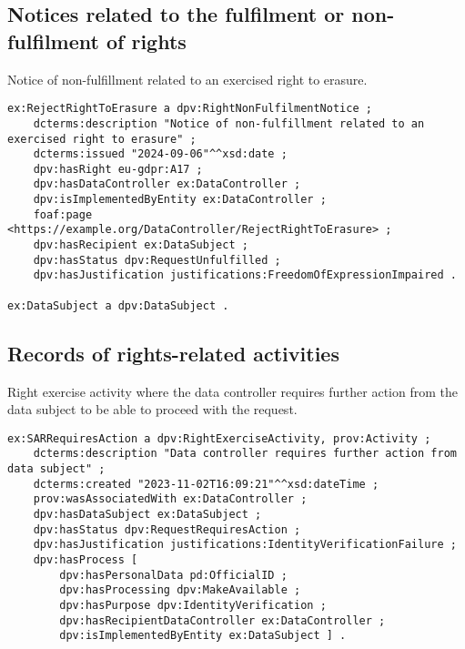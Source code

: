 \documentclass{IOS-Book-Article}     %
\begin{document}
\subsection{Notices related to the fulfilment or non-fulfilment of rights}
\label{sec:notices}

\begin{listing}
\caption{Notice of non-fulfillment related to an exercised right to erasure.}
\label{lst:notice}
\begin{verbatim}
ex:RejectRightToErasure a dpv:RightNonFulfilmentNotice ;
    dcterms:description "Notice of non-fulfillment related to an exercised right to erasure" ;
    dcterms:issued "2024-09-06"^^xsd:date ;
    dpv:hasRight eu-gdpr:A17 ;
    dpv:hasDataController ex:DataController ;
    dpv:isImplementedByEntity ex:DataController ;
    foaf:page <https://example.org/DataController/RejectRightToErasure> ;
    dpv:hasRecipient ex:DataSubject ;
    dpv:hasStatus dpv:RequestUnfulfilled ;
    dpv:hasJustification justifications:FreedomOfExpressionImpaired .

ex:DataSubject a dpv:DataSubject .
\end{verbatim}
\end{listing}

\subsection{Records of rights-related activities}
\label{sec:records}

\begin{listing}
\caption{Right exercise activity where the data controller requires further action from the data subject to be able to proceed with the request.}
\label{lst:activity}
\begin{verbatim}
ex:SARRequiresAction a dpv:RightExerciseActivity, prov:Activity ;
    dcterms:description "Data controller requires further action from data subject" ;
    dcterms:created "2023-11-02T16:09:21"^^xsd:dateTime ;
    prov:wasAssociatedWith ex:DataController ;
    dpv:hasDataSubject ex:DataSubject ;
    dpv:hasStatus dpv:RequestRequiresAction ;
    dpv:hasJustification justifications:IdentityVerificationFailure ;
    dpv:hasProcess [
        dpv:hasPersonalData pd:OfficialID ;
        dpv:hasProcessing dpv:MakeAvailable ;
        dpv:hasPurpose dpv:IdentityVerification ;
        dpv:hasRecipientDataController ex:DataController ;
        dpv:isImplementedByEntity ex:DataSubject ] .
\end{verbatim}
\end{listing}
\end{document}
